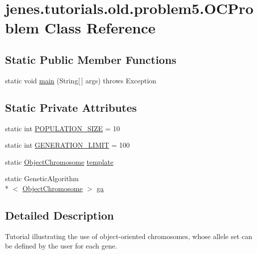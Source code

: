 \hypertarget{classjenes_1_1tutorials_1_1old_1_1problem5_1_1_o_c_problem}{\section{jenes.\-tutorials.\-old.\-problem5.\-O\-C\-Problem Class Reference}
\label{classjenes_1_1tutorials_1_1old_1_1problem5_1_1_o_c_problem}
}
\subsection*{Static Public Member Functions}
\begin{DoxyCompactItemize}
\item 
static void \hyperlink{classjenes_1_1tutorials_1_1old_1_1problem5_1_1_o_c_problem_afb39fb22d5193f3dd2c7bcd0db99cee4}{main} (String\mbox{[}$\,$\mbox{]} args)  throws Exception 
\end{DoxyCompactItemize}
\subsection*{Static Private Attributes}
\begin{DoxyCompactItemize}
\item 
static int \hyperlink{classjenes_1_1tutorials_1_1old_1_1problem5_1_1_o_c_problem_af46aa659ca0eed22cbfabe28b78282d6}{P\-O\-P\-U\-L\-A\-T\-I\-O\-N\-\_\-\-S\-I\-Z\-E} = 10
\item 
static int \hyperlink{classjenes_1_1tutorials_1_1old_1_1problem5_1_1_o_c_problem_a63d7a61bcda7da99c4588cc34165d115}{G\-E\-N\-E\-R\-A\-T\-I\-O\-N\-\_\-\-L\-I\-M\-I\-T} = 100
\item 
static \hyperlink{classjenes_1_1chromosome_1_1_object_chromosome}{Object\-Chromosome} \hyperlink{classjenes_1_1tutorials_1_1old_1_1problem5_1_1_o_c_problem_a9fb1b15412a3431af0d035babc358faf}{template}
\item 
static Genetic\-Algorithm\\*
$<$ \hyperlink{classjenes_1_1chromosome_1_1_object_chromosome}{Object\-Chromosome} $>$ \hyperlink{classjenes_1_1tutorials_1_1old_1_1problem5_1_1_o_c_problem_af3e6937a8aa09bcde81d7c8e5a7fb6c2}{ga}
\end{DoxyCompactItemize}


\subsection{Detailed Description}
Tutorial illustrating the use of object-\/oriented chromosomes, whose allele set can be defined by the user for each gene.

